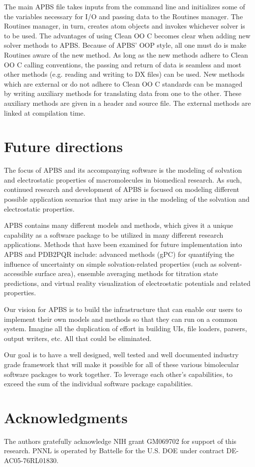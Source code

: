 \documentclass[journal=jpcbfk, manuscript=article]{achemso}
\begin{document}
The main APBS file takes inputs from the command line and initializes some of the variables necessary for I/O and passing data to the Routines manager. The Routines manager, in turn, creates atom objects and invokes whichever solver is to be used. The advantages of using Clean OO C becomes clear when adding new solver methods to APBS. Because of APBS' OOP style, all one must do is make Routines aware of the new method. As long as the new methods adhere to Clean OO C calling conventions, the passing and return of data is seamless and most other methods (e.g. reading and writing to DX files) can be used. New methods which are external or do not adhere to Clean OO C standards can be managed by writing auxiliary methods for translating data from one to the other. These auxiliary methods are given in a header and source file. The external methods are linked at compilation time.

\section{Future directions}
The focus of APBS and its accompanying software is the modeling of solvation and electrostatic properties of macromolecules in biomedical research. As such, continued research and development of APBS is focused on modeling different possible application scenarios that may arise in the modeling of the solvation and electrostatic properties. 

APBS contains many different models and methods, which gives it a unique capability as a software package to be utilized in many different research applications. Methods that have been examined for future implementation into APBS and PDB2PQR include: advanced methods (gPC) for quantifying the influence of uncertainty on simple solvation-related properties (such as solvent-accessible surface area), ensemble averaging methods for titration state predictions, and virtual reality visualization of electrostatic potentials and related properties.

Our vision for APBS is to build the infrastructure that can enable our users to implement their own models and methods so that they can run on a common system. Imagine all the duplication of effort in building UIs, file loaders, parsers, output writers, etc. All that could be eliminated. 

Our goal is to have a well designed, well tested and well documented industry grade framework that will make it possible for all of these various bimolecular software packages to work together. To leverage each other's capabilities, to exceed the sum of the individual software package capabilities.

\section{Acknowledgments}
The authors gratefully acknowledge NIH grant GM069702 for support of this research. PNNL is operated by Battelle for the U.S. DOE under contract DE-AC05-76RL01830.  


%
%
\end{document}
